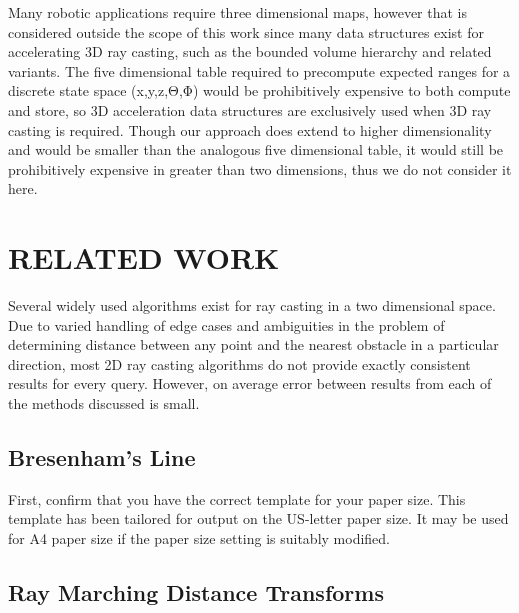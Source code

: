 \documentclass[letterpaper, 10 pt, conference]{ieeeconf}  %
\begin{document}
Many robotic applications require three dimensional maps, however that is considered outside the scope of this work since many data structures exist for accelerating 3D ray casting, such as the bounded volume hierarchy and related variants. The five dimensional table required to precompute expected ranges for a discrete state space (x,y,z,Θ,Φ) would be prohibitively expensive to both compute and store, so 3D acceleration data structures are exclusively used when 3D ray casting is required. Though our approach does extend to higher dimensionality and would be smaller than the analogous five dimensional table, it would still be prohibitively expensive in greater than two dimensions, thus we do not consider it here.

\section{RELATED WORK}

Several widely used algorithms exist for ray casting in a two dimensional space. Due to varied handling of edge cases and ambiguities in the problem of determining distance between any point and the nearest obstacle in a particular direction, most 2D ray casting algorithms do not provide exactly consistent results for every query. However, on average error between results from each of the methods discussed is small.

\subsection{Bresenham’s Line}

First, confirm that you have the correct template for your paper size. This template has been tailored for output on the US-letter paper size. 
It may be used for A4 paper size if the paper size setting is suitably modified.

\subsection{Ray Marching Distance Transforms}
\end{document}
